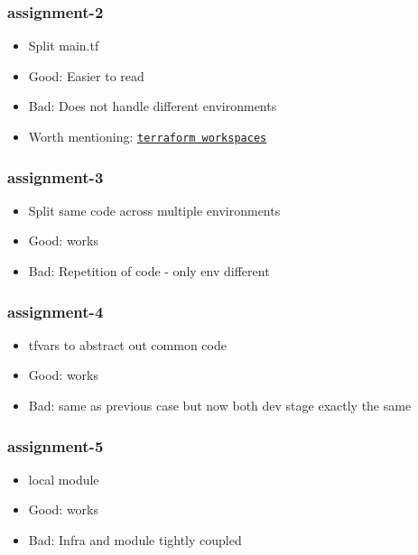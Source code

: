 \documentclass[9pt]{beamer}
\newcommand{\myblue} [1] {{\color{blue}#1}}
\begin{document}
\begin{frame}[fragile]
  \frametitle{assignment-2}

  \begin{itemize}[<+->]
    \item Split main.tf
    \item Good: Easier to read
    \item Bad: Does not handle different environments
    \item Worth mentioning: \myblue{\href{https://www.terraform.io/docs/state/workspaces.html}{\texttt{terraform workspaces}}}
  \end{itemize}

\end{frame}

\begin{frame}[fragile]
  \frametitle{assignment-3}

  \begin{itemize}[<+->]
    \item Split same code across multiple environments
    \item Good: works
    \item Bad: Repetition of code - only env different
  \end{itemize}

\end{frame}


\begin{frame}[fragile]
  \frametitle{assignment-4}

  \begin{itemize}[<+->]
    \item tfvars to abstract out common code
    \item Good: works
    \item Bad: same as previous case but now both dev stage exactly the same
  \end{itemize}

\end{frame}


\begin{frame}[fragile]
  \frametitle{assignment-5}

  \begin{itemize}[<+->]
    \item local module
    \item Good: works
    \item Bad: Infra and module tightly coupled
  \end{itemize}

\end{frame}
\end{document}
